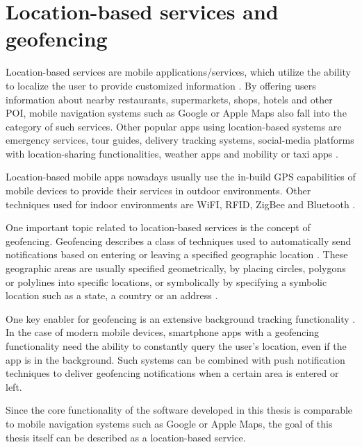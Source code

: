 \section{Location-based services and geofencing}
Location-based services are mobile applications/services, which utilize the ability to localize the user to provide customized information \cite{location_based_services}. By offering users information about nearby restaurants, supermarkets, shops, hotels and other POI, mobile navigation systems such as Google \cite{google_maps_website} or Apple Maps \cite{apple_maps_website} also fall into the category of such services. Other popular apps using location-based systems are emergency services, tour guides, delivery tracking systems, social-media platforms with location-sharing functionalities, weather apps and mobility or taxi apps \cite{geofencing_and_background_tracking} \cite{Sadhukhan2021}.

Location-based mobile apps nowadays usually use the in-build GPS capabilities of mobile devices to provide their services in outdoor environments. Other techniques used for indoor environments are WiFI, RFID, ZigBee and Bluetooth \cite{Sadhukhan2021}.

One important topic related to location-based services is the concept of geofencing.
Geofencing describes a class of techniques used to automatically send notifications based on entering or leaving a specified geographic location \cite{geofencing}. These geographic areas are usually specified geometrically, by placing circles, polygons or polylines into specific locations, or symbolically by specifying a symbolic location such as a state, a country or an address \cite{geofencing}.

One key enabler for geofencing is an extensive background tracking functionality \cite{geofencing_and_background_tracking}. In the case of modern mobile devices, smartphone apps with a geofencing functionality need the ability to constantly query the user's location, even if the app is in the background. Such systems can be combined with push notification techniques to deliver geofencing notifications when a certain area is entered or left.

Since the core functionality of the software developed in this thesis is comparable to mobile navigation systems such as Google or Apple Maps, the goal of this thesis itself can be described as a location-based service.


